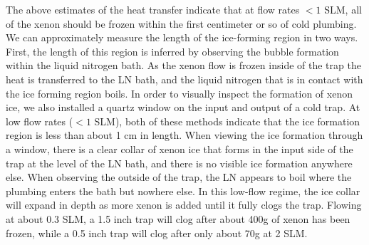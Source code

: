 The above estimates of the heat transfer indicate that at flow rates $<1$ SLM, all of the xenon should be frozen within the first centimeter or so of cold plumbing. We can approximately measure the length of the ice-forming region in two ways. First, the length of this region is inferred by observing the bubble formation within the liquid nitrogen bath. As the xenon flow is frozen inside of the trap the heat is transferred to the LN bath, and the liquid nitrogen that is in contact with the ice forming region boils. In order to visually inspect the formation of xenon ice, we also installed a quartz window on the input and output of a cold trap. At low flow rates ($<1$ SLM), both of these methods indicate that the ice formation region is less than about 1 cm in length. When viewing the ice formation through a window, there is a clear collar of xenon ice that forms in the input side of the trap at the level of the LN bath, and there is no visible ice formation anywhere else. When observing the outside of the trap, the LN appears to boil where the plumbing enters the bath but nowhere else. In this low-flow regime, the ice collar will expand in depth as more xenon is added until it fully clogs the trap. Flowing at about 0.3 SLM, a 1.5 inch trap will clog after about 400g of xenon has been frozen, while a 0.5 inch trap will clog after only about 70g at 2 SLM.
